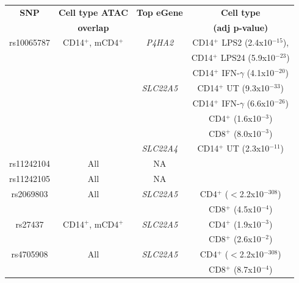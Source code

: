 \begin{table}[htbp]
\renewcommand{\arraystretch}{0.8}\text
\centering
\begin{tabular}{@{} c c c c}
\toprule
\textbf{SNP} & \textbf{Cell type ATAC}   & \textbf{Top eGene} & \textbf{Cell type } \\
             & \textbf{overlap}          &                    &\textbf{(adj p-value)}  \\
\midrule
\midrule
rs10065787   & CD14$^+$, mCD4$^+$        & \textit{P4HA2}   & CD14$^+$ LPS2 (2.4x10$^{-15}$),\\
             &                           &                  & CD14$^+$ LPS24 (5.9x10$^{-23}$) \\
						 &                           &                  & CD14$^+$ IFN-$\gamma$ (4.1x10$^{-20}$) \\
             &                           & \textit{SLC22A5} & CD14$^+$ UT (9.3x10$^{-33}$) \\
						 &                           &                  & CD14$^+$ IFN-$\gamma$ (6.6x10$^{-26}$)\\
						 &                           &                  & CD4$^+$ (1.6x10$^{-3}$) \\
						 &                           &                  & CD8$^+$ (8.0x10$^{-3}$) \\
						 &                           & \textit{SLC22A4} & CD14$^+$ UT (2.3x10$^{-11}$) \\
\midrule
rs11242104   & All                       &     NA        \\ 
\midrule
rs11242105   & All                       &     NA   \\
\midrule
rs2069803    & All                       & \textit{SLC22A5} & CD4$^+$ ($<$2.2x10$^{-308}$) \\
             &                           &                  & CD8$^+$ (4.5x10$^{-4}$) \\ 
\midrule
rs27437      & CD14$^+$, mCD4$^+$        & \textit{SLC22A5} & CD4$^+$ (1.9x10$^{-3}$)\\
             &                           &                  & CD8$^+$ (2.6x10$^{-2}$) \\ 
\midrule
rs4705908    & All                       & \textit{SLC22A5} & CD4$^+$ ($<$2.2x10$^{-308}$) \\
             &                           &                  & CD8$^+$ (8.7x10$^{-4}$)  \\

\end{tabular}
\end{table}

